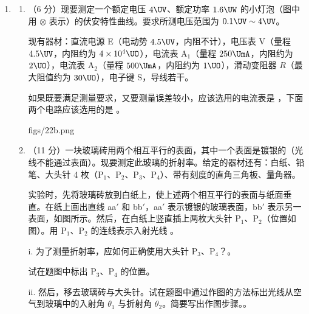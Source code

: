 \documentclass[\gkver]{gaokaozhenti}
\begin{document}
\begin{enumerate}

\item
\begin{enumerate}
	\item
	（6 分）现要测定一个额定电压 $4\UV$、额定功率 $1.6\UW$ 的小灯泡（图中用 $\otimes$ 表示）的伏安特性曲线。要求所测电压范围为 $0.1\UV\sim4\UV$。

	现有器材：直流电源 E（电动势 $4.5\UV$，内阻不计），电压表 V（量程 $4.5\UV$，内阻约为 $4\times10^{4}\UO$），电流表 A$_{1}$（量程 $250\UmA$，内阻约为 $2\UO$），电流表 A$_{2}$（量程 $500\UmA$，内阻约为 $1\UO$），滑动变阻器 $R$（最大阻值约为 $30\UO$），电子键 S，导线若干。

	如果既要满足测量要求，又要测量误差较小，应该选用的电流表是 ，下面两个电路应该选用的是 。

	{figs/22b.png}

	\item
	（11 分）一块玻璃砖用两个相互平行的表面，其中一个表面是镀银的（光线不能通过表面）。现要测定此玻璃的折射率。给定的器材还有：白纸、铅笔、大头针 4 枚（P$_{1}$、P$_{2}$、P$_{3}$、P$_{4}$）、带有刻度的直角三角板、量角器。

	实验时，先将玻璃砖放到白纸上，使上述两个相互平行的表面与纸面垂直。在纸上画出直线 aa$'$ 和 bb$'$，aa$'$ 表示镀银的玻璃表面，bb$'$ 表示另一表面，如图所示。然后，在白纸上竖直插上两枚大头针 P$_{1}$、P$_{2}$（位置如图）。用 P$_{1}$、P$_{2}$ 的连线表示入射光线 。

	i. 为了测量折射率，应如何正确使用大头针 P$_{3}$、P$_{4}$？\tkanswer[6cm]{}。

	试在题图中标出 P$_{3}$、P$_{4}$ 的位置。

	ii. 然后，移去玻璃砖与大头针。试在题图中通过作图的方法标出光线从空气到玻璃中的入射角 $\theta_{1}$ 与折射角 $\theta_{2}$。简要写出作图步骤。\tkanswer[6cm]{}。


\end{enumerate}
\end{enumerate}
\end{document}
